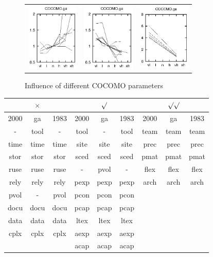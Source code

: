 \begin{figure}
\begin{center}
\begin{tabular}{c|c|c}
\includegraphics[width=2.5cm]{cocgadown.eps}&
\includegraphics[width=2.5cm]{cocgaup.eps}&
\includegraphics[width=2.5cm]{cocgacliff.eps}
\end{tabular}
\end{center}
\caption{Influence of different COCOMO parameters}
\end{figure}


\begin{center}
{\scriptsize
\begin{tabular}{ccc|ccc|ccc}
&$\times$&&&$\surd$&&&$\surd\surd$ &\\\hline
2000&ga&1983&2000&ga&1983&2000&ga&1983\\\hline
-&tool&-&tool&-&tool&team&team&team\\
time&time&time&site&site&site&prec&prec&prec\\
stor&stor&stor&sced&sced&sced&pmat&pmat&pmat\\
ruse&ruse&ruse&-&pvol&-&flex&flex&flex\\
rely&rely&rely&pexp&pexp&pexp&arch&arch&arch\\
pvol&-&pvol&pcon&pcon&pcon&&&\\
docu&docu&docu&pcap&pcap&pcap&&&\\
data&data&data&ltex&ltex&ltex&&&\\
cplx&cplx&cplx&aexp&aexp&aexp&&&\\
&&&acap&acap&acap&&&
\end{tabular}}
\end{center}
